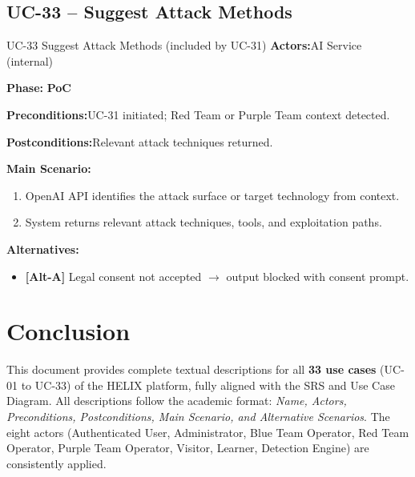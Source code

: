 \documentclass[12pt,a4paper]{report}
\newcommand{\ucfield}[2]{%
    \noindent\textbf{\color{helixpurplemid}#1:}\quad #2\par\medskip
}
\newcommand{\ucphase}[1]{%
    \noindent\textbf{\color{helixpurplemid}Phase:}\quad%
    \ifstrequal{#1}{PoC}{\textcolor{helixteal}{\textbf{PoC}}}{\textcolor{helixamber}{\textbf{Future MVP}}}%
    \par\medskip
}
\begin{document}
\section{UC-33 -- Suggest Attack Methods}
\begin{ucbox}{UC-33 \quad Suggest Attack Methods \textnormal{(included by UC-31)}}
    \ucfield{Actors}{AI Service (internal)}
    \ucphase{PoC}
    \ucfield{Preconditions}{UC-31 initiated; Red Team or Purple Team context detected.}
    \ucfield{Postconditions}{Relevant attack techniques returned.}
    \textbf{\color{helixpurplemid}Main Scenario:}
    \begin{enumerate}
        \item OpenAI API identifies the attack surface or target technology from context.
        \item System returns relevant attack techniques, tools, and exploitation paths.
    \end{enumerate}
    \textbf{\color{helixpurplemid}Alternatives:}
    \begin{itemize}
        \item \textbf{[Alt-A]} Legal consent not accepted $\rightarrow$ output blocked with consent prompt.
    \end{itemize}
\end{ucbox}

\chapter*{Conclusion}

\begin{successbox}[title=Summary]
    This document provides complete textual descriptions for all \textbf{33 use cases}
    (UC-01 to UC-33) of the HELIX platform, fully aligned with the SRS and Use Case Diagram.
    All descriptions follow the academic format: \textit{Name, Actors, Preconditions,
    Postconditions, Main Scenario, and Alternative Scenarios}. The eight actors
    (Authenticated User, Administrator, Blue Team Operator, Red Team Operator,
    Purple Team Operator, Visitor, Learner, Detection Engine) are consistently applied.
\end{successbox}
\end{document}
